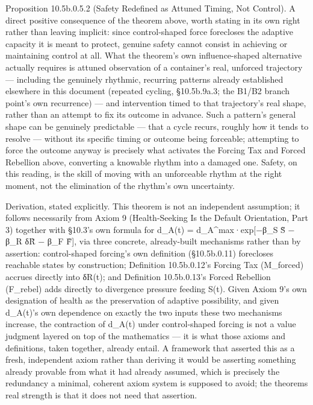 \documentclass[
]{article}
\begin{document}
Proposition 10.5b.0.5.2 (Safety Redefined as Attuned Timing, Not
Control). A direct positive consequence of the theorem above, worth
stating in its own right rather than leaving implicit: since
control-shaped force forecloses the adaptive capacity it is meant to
protect, genuine safety cannot consist in achieving or maintaining
control at all. What the theorem's own influence-shaped alternative
actually requires is attuned observation of a container's real, unforced
trajectory --- including the genuinely rhythmic, recurring patterns
already established elsewhere in this document (repeated cycling,
§10.5b.9a.3; the B1/B2 branch point's own recurrence) --- and
intervention timed to that trajectory's real shape, rather than an
attempt to fix its outcome in advance. Such a pattern's general shape
can be genuinely predictable --- that a cycle recurs, roughly how it
tends to resolve --- without its specific timing or outcome being
forceable; attempting to force the outcome anyway is precisely what
activates the Forcing Tax and Forced Rebellion above, converting a
knowable rhythm into a damaged one. Safety, on this reading, is the
skill of moving with an unforceable rhythm at the right moment, not the
elimination of the rhythm's own uncertainty.

Derivation, stated explicitly. This theorem is not an independent
assumption; it follows necessarily from Axiom 9 (Health-Seeking Is the
Default Orientation, Part 3) together with §10.3's own formula for
d\_A(t) = d\_A\^{}max·exp{[}−β\_S S̃ − β\_R δR̃ − β\_F F̃{]}, via three
concrete, already-built mechanisms rather than by assertion:
control-shaped forcing's own definition (§10.5b.0.11) forecloses
reachable states by construction; Definition 10.5b.0.12's Forcing Tax
(M\_forced) accrues directly into δR(t); and Definition 10.5b.0.13's
Forced Rebellion (F\_rebel) adds directly to divergence pressure feeding
S(t). Given Axiom 9's own designation of health as the preservation of
adaptive possibility, and given d\_A(t)'s own dependence on exactly the
two inputs these two mechanisms increase, the contraction of d\_A(t)
under control-shaped forcing is not a value judgment layered on top of
the mathematics --- it is what those axioms and definitions, taken
together, already entail. A framework that asserted this as a fresh,
independent axiom rather than deriving it would be asserting something
already provable from what it had already assumed, which is precisely
the redundancy a minimal, coherent axiom system is supposed to avoid;
the theorems real strength is that it does not need that assertion.
\end{document}
